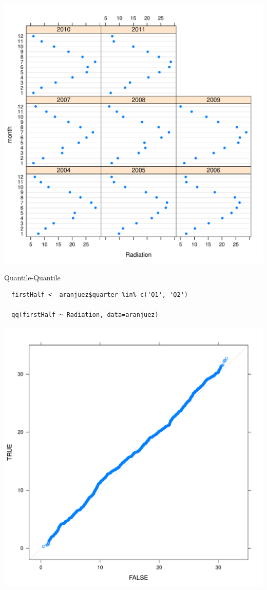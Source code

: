 \documentclass[xcolor={usenames,svgnames,dvipsnames}]{beamer}
\begin{document}
\begin{frame}[label=sec-2-1-49]{}
\includegraphics[width=.9\linewidth]{figs/dotplot.pdf}
\end{frame}


\begin{frame}[fragile,label=sec-2-1-50]{Quantile-Quantile}
 \lstset{language=R,label= ,caption= ,numbers=none}
\begin{lstlisting}
  firstHalf <- aranjuez$quarter %in% c('Q1', 'Q2')
  
  qq(firstHalf ~ Radiation, data=aranjuez)
\end{lstlisting}
\end{frame}

\begin{frame}[label=sec-2-1-51]{}
\includegraphics[width=.9\linewidth]{figs/qqHalf.pdf}
\end{frame}
\end{document}
